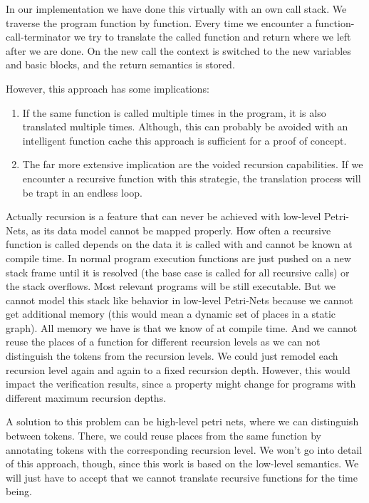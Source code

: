 In our implementation we have done this virtually with an own call stack.
We traverse the program function by function.
Every time we encounter a function-call-terminator we try to translate the called function and return where we left after we are done.
On the new call the context is switched to the new variables and basic blocks, and the return semantics is stored.

However, this approach has some implications:
\begin{enumerate}
    \item If the same function is called multiple times in the program, it is also translated multiple times.
    Although, this can probably be avoided with an intelligent function cache this approach is sufficient for a proof of concept.
    \item The far more extensive implication are the voided recursion capabilities.
    If we encounter a recursive function with this strategie, the translation process will be trapt in an endless loop.
\end{enumerate}
Actually recursion is a feature that can never be achieved with low-level Petri-Nets, as its data model cannot be mapped properly.
How often a recursive function is called depends on the data it is called with and cannot be known at compile time.
In normal program execution functions are just pushed on a new stack frame until it is resolved (the base case is called for all recursive calls) or the stack overflows.
Most relevant programs will be still executable.
But we cannot model this stack like behavior in low-level Petri-Nets because we cannot get additional memory (this would mean a dynamic set of places in a static graph).
All memory we have is that we know of at compile time.
And we cannot reuse the places of a function for different recursion levels as we can not distinguish the tokens from the recursion levels.
We could just remodel each recursion level again and again to a fixed recursion depth.
However, this would impact the verification results, since a property might change for programs with different maximum recursion depths.

A solution to this problem can be high-level petri nets, where we can distinguish between tokens.
There, we could reuse places from the same function by annotating tokens with the corresponding recursion level.
We won't go into detail of this approach, though, since this work is based on the low-level semantics.
We will just have to accept that we cannot translate recursive functions for the time being.

